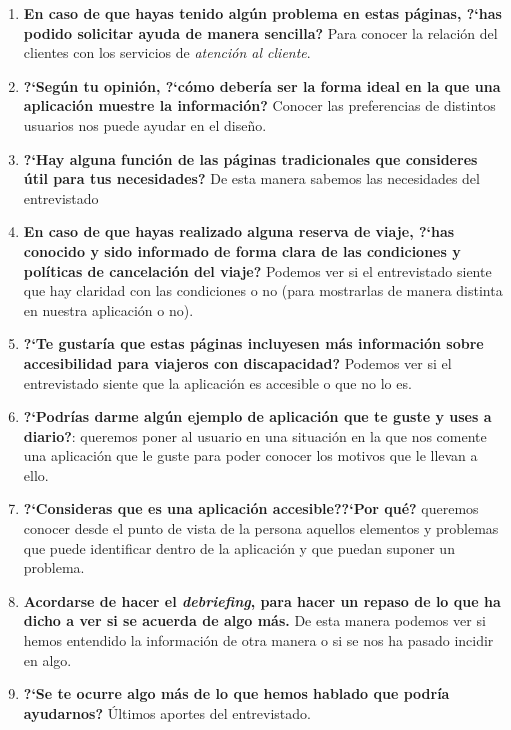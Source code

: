 \begin{enumerate}
    \item {\textbf{En caso de que hayas tenido algún problema en estas páginas, ?`has podido solicitar ayuda de manera sencilla?}} Para conocer la relación del clientes con los servicios
                de \textit{atención al cliente}.
    \item {\textbf{?`Según tu opinión, ?`cómo debería ser la forma ideal en la que una aplicación muestre la información?}} Conocer las preferencias de distintos usuarios
                nos puede ayudar en el diseño.
    \item {\textbf{?`Hay alguna función de las páginas tradicionales que consideres útil para tus necesidades?}} De esta manera sabemos las necesidades del entrevistado
    \item {\textbf{En caso de que hayas realizado alguna reserva de viaje, ?`has conocido y sido informado de forma clara de las condiciones
                        y políticas de cancelación del viaje?}} Podemos ver si el entrevistado siente que hay claridad con las condiciones o no (para mostrarlas de manera distinta
                                                                en nuestra aplicación o no).
    \item {\textbf{?`Te gustaría que estas páginas incluyesen más información sobre accesibilidad para viajeros con discapacidad?}} Podemos ver si el entrevistado siente que la aplicación
                es accesible o que no lo es.
    \item {\textbf{?`Podrías darme algún ejemplo de aplicación que te guste y uses a diario?}}: queremos poner al usuario en una situación
    en la que nos comente una aplicación que le guste para poder conocer los motivos que le llevan a ello.
    \item {\textbf{?`Consideras que es una aplicación accesible??`Por qué?}} queremos conocer desde el punto de vista de la persona aquellos
    elementos y problemas que puede identificar dentro de la aplicación y que puedan suponer un problema.
    \item {\textbf{Acordarse de hacer el \textit{debriefing}, para hacer un repaso de lo que ha dicho a ver si se acuerda de algo más.}} De esta manera podemos ver si hemos entendido
            la información de otra manera o si se nos ha pasado incidir en algo.
    \item {\textbf{?`Se te ocurre algo más de lo que hemos hablado que podría ayudarnos?}} Últimos aportes del entrevistado.
 \end{enumerate}
 

